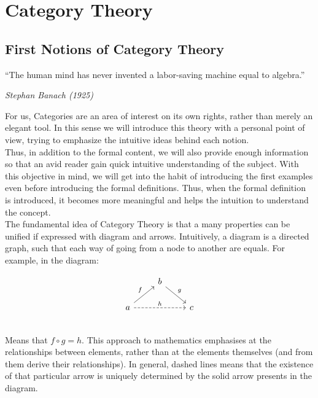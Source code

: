 

\part{Category Theory}
\label{Part1}



\chapter{First Notions of Category Theory}

\epigraph{“The human mind has never invented a labor-saving machine equal to algebra.” }{\textit{Stephan Banach (1925)}}

For us, Categories are an area of interest on its own rights, rather than merely an elegant tool. In this sense we will introduce this theory with a personal point of view, trying to emphasize the intuitive ideas behind each notion.\\

Thus, in addition to the formal content, we will also provide enough information so that an avid reader gain quick intuitive understanding of the subject. With this objective in mind, we will get into the habit of introducing the first examples even before introducing the formal definitions. Thus, when the formal definition is introduced, it becomes more meaningful and helps the intuition to understand the concept.\\

The fundamental idea of Category Theory is that a many properties can be unified if expressed with diagram and arrows. Intuitively, a diagram is a directed graph, such that each way of going from a node to another are equals. For example, in the diagram:

\[
  \begin{tikzcd}
    & b \arrow[rd, "g"]& \\
    a\arrow[ru, "f"] \arrow[rr, "h", dashed] && c\\
  \end{tikzcd}
\]
Means that $f\circ g = h$. This approach to mathematics emphasises  at the relationships between elements, rather than at the elements themselves (and from them derive their relationships). In general, dashed lines means that the existence of that particular arrow is uniquely determined by the solid arrow presents in the diagram.\\

